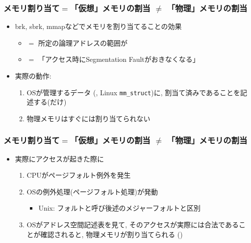 \documentclass[12pt,dvipdfmx]{beamer}
\begin{document}
\begin{frame}
  \frametitle{メモリ割り当て$=$「仮想」メモリの割当 $\neq$ 「物理」メモリの割当}
  \begin{itemize}
  \item brk, sbrk, mmapなどでメモリを割り当てることの効果
    \begin{itemize}
    \item $=$ 所定の論理アドレスの範囲が
    \item $=$ 「アクセス時にSegmentation Faultがおきなくなる」
    \end{itemize}
  \item 実際の動作:
    \begin{enumerate}
    \item OSが管理するデータ
      (, Linux {\tt mm\_struct})に,
      割当て済みであることを記述する(だけ)
    \item 物理メモリはすぐには割り当てられない
    \end{enumerate}
  \end{itemize}
\end{frame}

\begin{frame}
  \frametitle{メモリ割り当て$=$「仮想」メモリの割当 $\neq$ 「物理」メモリの割当}
  \begin{itemize}
  \item 実際にアクセスが起きた際に
    \begin{enumerate}
    \item CPUがページフォルト例外を発生
    \item OSの例外処理(ページフォルト処理)が発動
      \begin{itemize}
      \item Unix: フォルトと呼び後述のメジャーフォルトと区別
      \end{itemize}
    \item OSがアドレス空間記述表を見て,
      そのアクセスが実際には合法であることが確認されると,
      物理メモリが割り当てられる
      ()
    \end{enumerate}
  \end{itemize}
\end{frame}
\end{document}
